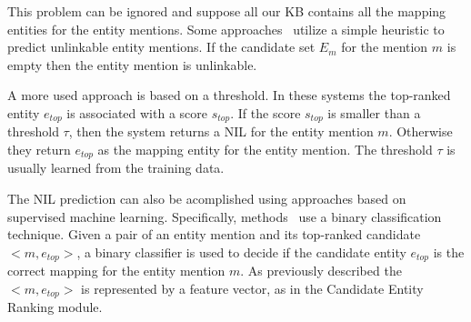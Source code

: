 This problem can be ignored and suppose all our KB contains all the mapping entities for the entity mentions. Some approaches~\cite{cucerzan2007large} utilize a simple heuristic to predict unlinkable entity mentions. If the candidate set $E_m$ for the mention $m$ is empty then the entity mention is unlinkable.


A more used approach is based on a threshold. In these systems the top-ranked entity $e_{top}$ is associated with a score $s_{top}$. If the score $s_{top}$ is smaller than a threshold $\tau$, then the system returns a NIL for the entity mention $m$. Otherwise they return $e_{top}$ as the mapping entity for the entity mention. The threshold $\tau$ is usually learned from the training data.


The NIL prediction can also be acomplished using approaches based on supervised machine learning. Specifically, methods~\cite{ratinov2011local, zheng2010learning} use a binary classification technique. Given a pair of an entity mention and its top-ranked candidate $<\!\!m, e_{top}\!\!>$, a binary classifier is used to decide if the candidate entity $e_{top}$ is the correct mapping for the entity mention $m$. As previously described the $<\!\!m, e_{top}\!\!>$ is represented by a feature vector, as in the Candidate Entity Ranking module.

